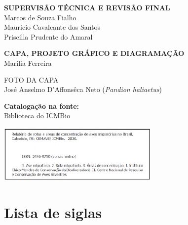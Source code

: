 \documentclass[
]{scrbook}
\begin{document}
\textbf{SUPERVISÃO TÉCNICA E REVISÃO FINAL}\\
Marcos de Souza Fialho\\
Mauricio Cavalcante dos Santos\\
Priscilla Prudente do Amaral

\textbf{CAPA, PROJETO GRÁFICO E DIAGRAMAÇÃO}\\
Marília Ferreira

FOTO DA CAPA\\
José Anselmo D'Affonsêca Neto (\emph{Pandion haliaetus})

\textbf{Catalogação na fonte:}\\
Biblioteca do ICMBio

\includegraphics[width=0.75\linewidth]{imagens/ficha}

\hypertarget{lista-siglas}{%
\chapter*{Lista de siglas}\label{lista-siglas}}
\end{document}
